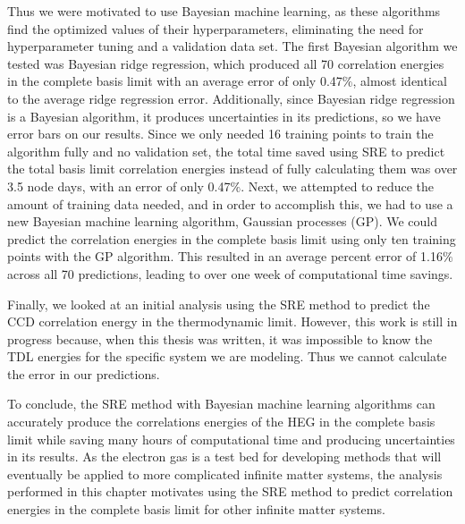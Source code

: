 Thus we were motivated to use Bayesian machine learning, as these algorithms find the optimized values of their hyperparameters, eliminating the need for hyperparameter tuning and a validation data set. The first Bayesian algorithm we tested was Bayesian ridge regression, which produced all 70 correlation energies in the complete basis limit with an average error of only 0.47$\%$, almost identical to the average ridge regression error. Additionally, since Bayesian ridge regression is a Bayesian algorithm, it produces uncertainties in its predictions, so we have error bars on our results. Since we only needed 16 training points to train the algorithm fully and no validation set, the total time saved using SRE to predict the total basis limit correlation energies instead of fully calculating them was over 3.5 node days, with an error of only 0.47$\%$. Next, we attempted to reduce the amount of training data needed, and in order to accomplish this, we had to use a new Bayesian machine learning algorithm, Gaussian processes (GP). We could predict the correlation energies in the complete basis limit using only ten training points with the GP algorithm. This resulted in an average percent error of 1.16$\%$ across all 70 predictions, leading to over one week of computational time savings.  

Finally, we looked at an initial analysis using the SRE method to predict the CCD correlation energy in the thermodynamic limit. However, this work is still in progress because, when this thesis was written, it was impossible to know the TDL energies for the specific system we are modeling. Thus we cannot calculate the error in our predictions.

To conclude, the SRE method with Bayesian machine learning algorithms can accurately produce the correlations energies of the HEG in the complete basis limit while saving many hours of computational time and producing uncertainties in its results. As the electron gas is a test bed for developing methods that will eventually be applied to more complicated infinite matter systems, the analysis performed in this chapter motivates using the SRE method to predict correlation energies in the complete basis limit for other infinite matter systems.
